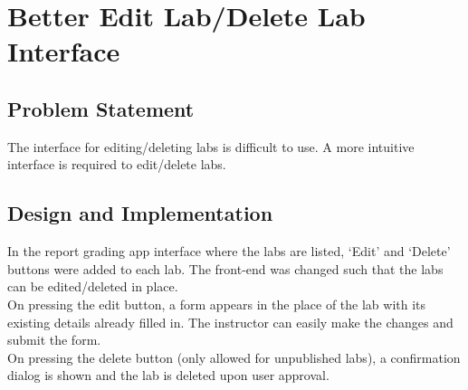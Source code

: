 \section{Better Edit Lab/Delete Lab Interface}
\subsection{Problem Statement}
The interface for editing/deleting labs is difficult to use. A more intuitive interface is required to edit/delete labs.

\subsection{Design and Implementation}
In the report grading app interface where the labs are listed, `Edit' and `Delete' buttons were added to each lab. The front-end was changed such that the labs can be edited/deleted in place.\\
On pressing the edit button, a form appears in the place of the lab with its existing details already filled in. The instructor can easily make the changes and submit the form.\\
On pressing the delete button (only allowed for unpublished labs), a confirmation dialog is shown and the lab is deleted upon user approval.